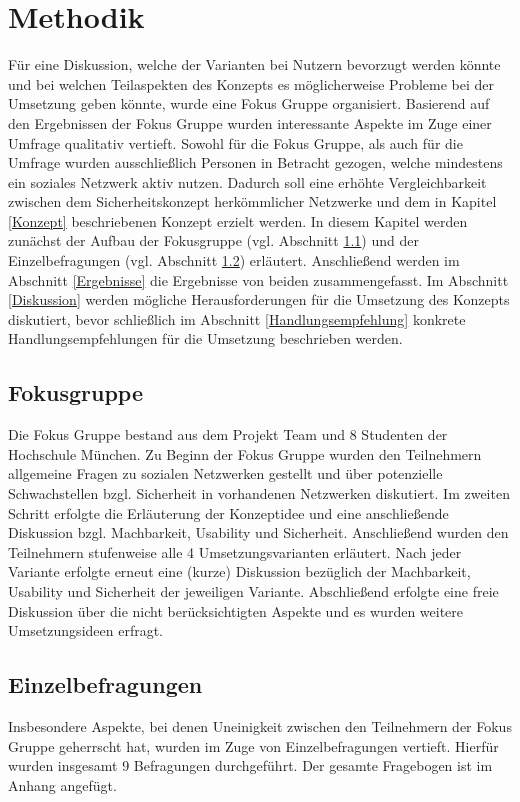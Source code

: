 \documentclass{sigchi}
\begin{document}
\section{Methodik}
Für eine Diskussion, welche der Varianten bei Nutzern bevorzugt werden könnte und bei welchen Teilaspekten des Konzepts es möglicherweise Probleme bei der Umsetzung geben könnte, wurde eine Fokus Gruppe organisiert. Basierend auf den Ergebnissen der Fokus Gruppe wurden interessante Aspekte im Zuge einer Umfrage qualitativ vertieft. Sowohl für die Fokus Gruppe, als auch für die Umfrage wurden ausschließlich Personen in Betracht gezogen, welche mindestens ein soziales Netzwerk aktiv nutzen. Dadurch soll eine erhöhte Vergleichbarkeit zwischen dem Sicherheitskonzept herkömmlicher Netzwerke und dem in Kapitel \ref{Konzept} beschriebenen Konzept erzielt werden. In diesem Kapitel werden zunächst der Aufbau der Fokusgruppe (vgl. Abschnitt \ref{Fokusgruppe}) und der Einzelbefragungen (vgl. Abschnitt \ref{Einzelbefragung}) erläutert. Anschließend werden im Abschnitt \ref{Ergebnisse} die Ergebnisse von beiden zusammengefasst. Im Abschnitt \ref{Diskussion} werden mögliche Herausforderungen für die Umsetzung des Konzepts diskutiert, bevor schließlich im Abschnitt \ref{Handlungsempfehlung} konkrete Handlungsempfehlungen für die Umsetzung beschrieben werden.

\subsection{Fokusgruppe}
\label{Fokusgruppe}
Die Fokus Gruppe bestand aus dem Projekt Team und 8 Studenten der Hochschule München. Zu Beginn der Fokus Gruppe wurden den Teilnehmern allgemeine Fragen zu sozialen Netzwerken gestellt und über potenzielle Schwachstellen bzgl. Sicherheit in vorhandenen Netzwerken diskutiert. Im zweiten Schritt erfolgte die Erläuterung der Konzeptidee und eine anschließende Diskussion bzgl. Machbarkeit, Usability und Sicherheit. Anschließend wurden den Teilnehmern stufenweise alle 4 Umsetzungsvarianten erläutert. Nach jeder Variante erfolgte erneut eine (kurze) Diskussion bezüglich der Machbarkeit, Usability und Sicherheit der jeweiligen Variante. Abschließend erfolgte eine freie Diskussion über die nicht berücksichtigten Aspekte und es wurden weitere Umsetzungsideen erfragt.
 
\subsection{Einzelbefragungen}
\label{Einzelbefragung}
Insbesondere Aspekte, bei denen Uneinigkeit zwischen den Teilnehmern der Fokus Gruppe geherrscht hat, wurden im Zuge von Einzelbefragungen vertieft. Hierfür wurden insgesamt 9 Befragungen durchgeführt. Der gesamte Fragebogen ist im Anhang angefügt. 
\end{document}
